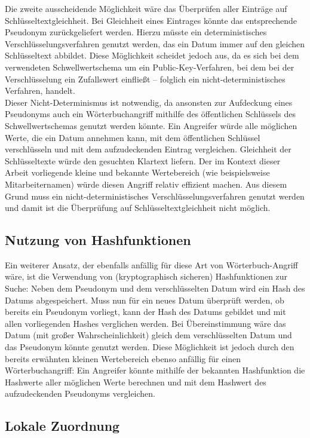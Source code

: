 Die zweite ausscheidende Möglichkeit wäre das Überprüfen aller Einträge auf Schlüsseltextgleichheit. Bei Gleichheit eines Eintrages könnte das entsprechende Pseudonym zurückgeliefert werden. Hierzu müsste ein deterministisches Verschlüsselungsverfahren genutzt werden, das ein Datum immer auf den gleichen Schlüsseltext abbildet. Diese Möglichkeit scheidet jedoch aus, da es sich bei dem verwendeten Schwellwertschema um ein Public-Key-Verfahren, bei dem bei der Verschlüsselung ein Zufallswert einfließt -- folglich ein nicht-deterministisches Verfahren, handelt.\\
Dieser Nicht-Determinismus ist notwendig, da ansonsten zur Aufdeckung eines Pseudonyms auch ein Wörterbuchangriff mithilfe des öffentlichen Schlüssels des Schwellwertschemas genutzt werden könnte. Ein Angreifer würde alle möglichen Werte, die ein Datum annehmen kann, mit dem öffentlichen Schlüssel verschlüsseln und mit dem aufzudeckenden Eintrag vergleichen. Gleichheit der Schlüsseltexte würde den gesuchten Klartext liefern. Der im Kontext dieser Arbeit vorliegende kleine und bekannte Wertebereich (wie beispielsweise Mitarbeiternamen) würde diesen Angriff relativ effizient machen. Aus diesem Grund muss ein nicht-deterministisches Verschlüsselungsverfahren genutzt werden und damit ist die Überprüfung auf Schlüsseltextgleichheit nicht möglich.


\subsection{Nutzung von Hashfunktionen}

Ein weiterer Ansatz, der ebenfalls anfällig für diese Art von Wörterbuch-Angriff wäre, ist die Verwendung von (kryptographisch sicheren) Hashfunktionen zur Suche: Neben dem Pseudonym und dem verschlüsselten Datum wird ein Hash des Datums abgespeichert. Muss nun für ein neues Datum überprüft werden, ob bereits ein Pseudonym vorliegt, kann der Hash des Datums gebildet und mit allen vorliegenden Hashes verglichen werden. Bei Übereinstimmung wäre das Datum (mit großer Wahrscheinlichkeit) gleich dem verschlüsselten Datum und das Pseudonym könnte genutzt werden. Diese Möglichkeit ist jedoch durch den bereits erwähnten kleinen Wertebereich ebenso anfällig für einen Wörterbuchangriff: Ein Angreifer könnte mithilfe der bekannten Hashfunktion die Hashwerte aller möglichen Werte berechnen und mit dem Hashwert des aufzudeckenden Pseudonyms vergleichen.

\subsection{Lokale Zuordnung}

